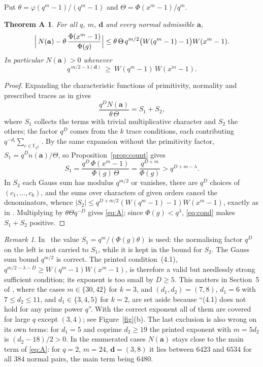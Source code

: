 \documentclass[11pt,a4paper]{amsart}
\newtheorem*{theoremA}{Theorem A}
\theoremstyle{remark}
\newtheorem{remark}[theorem]{Remark}
\newcommand{\F}{\mathbb{F}}
\newcommand{\bd}{\mathbf{d}}
\newcommand{\ba}{\mathbf{a}}
\newcommand{\MKB}{\cite{MKB}}
\begin{document}
Put $\theta=\varphi(q^m-1)/(q^m-1)$ and $\Theta=\Phi(x^m-1)/q^m$.

\begin{theoremA}
For all $q$, $m$, $\bd$ and every normal admissible $\ba$,
\begin{equation}\label{eq:A}
\Bigl|\,N(\ba)-\theta\,\frac{\Phi(x^m-1)}{\Phi(g)}\Bigr|\le
\theta\,\Theta\,q^{m/2}\bigl(W(q^m-1)-1\bigr)W(x^m-1).
\end{equation}
In particular $N(\ba)>0$ whenever
\begin{equation}\label{eq:cond}
q^{\,m/2-\lambda(\bd)}\ \ge\ W(q^m-1)\,W(x^m-1).
\end{equation}
\end{theoremA}
\begin{proof}
Expanding the characteristic functions of primitivity, normality and prescribed traces as in
\cite[Section~4]{MKB} gives
\[
\frac{q^{D}N(\ba)}{\theta\,\Theta}=S_1+S_2 ,
\]
where $S_1$ collects the terms with trivial multiplicative character and $S_2$ the others; the factor $q^{D}$
comes from the $k$ trace conditions, each contributing $q^{-d_i}\sum_{c\in\F_{q^{d_i}}}$. By the same
expansion without the primitivity factor, $S_1=q^{D}n(\ba)/\Theta$, so Proposition~\ref{prop:count} gives
\[
S_1=\frac{q^{D}\,\Phi(x^m-1)}{\Phi(g)\,\Theta}=\frac{q^{D+m}}{\Phi(g)}>q^{D+m-\lambda}.
\]
In $S_2$ each Gauss sum has modulus $q^{m/2}$ or vanishes, there are $q^{D}$ choices of
$(c_1,\dots,c_k)$, and the sums over characters of given orders cancel the denominators, whence
$|S_2|\le q^{D+m/2}(W(q^m-1)-1)W(x^m-1)$, exactly as in \MKB. Multiplying by $\theta\Theta q^{-D}$ gives
\eqref{eq:A}; since $\Phi(g)<q^{\lambda}$, \eqref{eq:cond} makes $S_1+S_2$ positive.
\end{proof}

\begin{remark}\label{rem:slip}
In \MKB\ the value $S_1=q^{m}/(\Phi(g)\theta)$ is used: the normalising factor $q^{D}$ on the left is not
carried to $S_1$, while it is kept in the bound for $S_2$. The Gauss sum bound $q^{m/2}$ is correct. The
printed condition~(4.1), $q^{m/2-\lambda-D}\ge W(q^m-1)W(x^m-1)$, is therefore a valid but needlessly strong
sufficient condition; its exponent is too small by $D\ge5$. This matters in Section~5 of \MKB, where the
cases $m\in\{30,42\}$ for $k=3$, and $(d_1,d_2)=(7,8)$, $d_1=6$ with $7\le d_2\le11$, and $d_1\in\{3,4,5\}$
for $k=2$, are set aside because ``(4.1) does not hold for any prime power $q$''. With the correct exponent
all of them are covered for large $q$ except $(3,4)$; see Figure~\ref{fig}(b). The last exclusion is also
wrong on its own terms: for $d_1=5$ and coprime $d_2\ge19$ the printed exponent with $m=5d_2$ is $(d_2-18)/2>0$.
In the enumerated cases $N(\ba)$ stays close to the main term of \eqref{eq:A}: for $q=2$, $m=24$,
$\bd=(3,8)$ it lies between $6423$ and $6534$ for all $384$ normal pairs, the main term being $6480$.
\end{remark}
\end{document}
